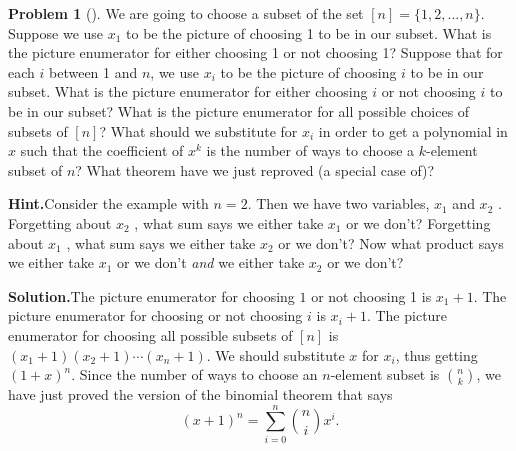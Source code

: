 \documentclass[10pt,]{book}
\theoremstyle{plain}
\theoremstyle{definition}
\newtheorem{activity}[project]{Problem}
\theoremstyle{definition}
\numberwithin{equation}{chapter}
\begin{document}
\begin{activity}[]\label{reprovingbinomialtheorem}
We are going to choose a subset of the set \([n]=\{1,2,\ldots, n\}\). Suppose we use \(x_1\) to be the picture of choosing 1 to be in our subset. What is the picture enumerator for either choosing 1 or not choosing 1? Suppose that for each \(i\) between 1 and \(n\), we use \(x_i\) to be the picture of choosing \(i\) to be in our subset. What is the picture enumerator for either choosing \(i\) or not choosing \(i\) to be in our subset? What is the picture enumerator for all possible choices of subsets of \([n]\)? What should we substitute for \(x_i\) in order to get a polynomial in \(x\) such that the coefficient of \(x^k\) is the number of ways to choose a \(k\)-element subset of \(n\)? What theorem have we just reproved (a special case of)?%
\par\medskip\noindent%
\textbf{Hint.}\quad Consider the example with \(n = 2\). Then we have two variables, \(x_1\) and \(x_2\) .  Forgetting about \(x_2\) , what sum says we either take \(x_1\) or we don't? Forgetting about \(x_1\) , what sum says we either take \(x_2\) or we don't? Now what product says we either take \(x_1\) or we don't \emph{and} we either take \(x_2\) or we don't?%
\par\medskip\noindent%
\textbf{Solution.}\quad The picture enumerator for choosing \(1\) or not choosing 1 is \(x_1+1\). The picture enumerator for choosing or not choosing \(i\) is \(x_i+1\).  The picture enumerator for choosing all possible subsets of \([n]\) is \((x_1+1)(x_2+1)\cdots(x_n+1).\) We should substitute \(x\) for \(x_i\), thus getting \((1+x)^n\). Since the number of ways to choose an \(n\)-element subset is \(\binom{n}{k}\), we have just proved the version of the binomial theorem that says%
\begin{equation*}
(x+1)^n=\sum_{i=0}^n \binom{n}{i}x^i.
\end{equation*}
%
\end{activity}
\end{document}
